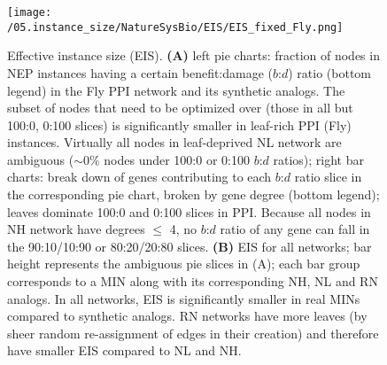 \begin{figure}[H]%
    \texttt{[image: /05.instance\_size/NatureSysBio/EIS/EIS\_fixed\_Fly.png]}
    \caption{
                Effective instance size (EIS). \textbf{(A)} left pie charts: fraction of nodes in NEP instances having a certain benefit:damage ($b$:$d$) ratio (bottom legend) in the Fly PPI network and its synthetic analogs. The subset of nodes that need to be optimized over (those in all but 100:0, 0:100 slices) is significantly smaller in leaf-rich PPI (Fly) instances. Virtually all nodes in leaf-deprived NL network are ambiguous (${\sim}0\%$ nodes under 100:0 or 0:100 $b$:$d$ ratios); right bar charts: break down of genes contributing to each $b$:$d$ ratio slice in the corresponding pie chart, broken by gene degree (bottom legend); leaves dominate 100:0 and 0:100 slices in PPI. Because all nodes in NH network have degrees  $\leq$ 4, no $b$:$d$ ratio of any gene can fall in the 90:10/10:90 or 80:20/20:80  slices. \textbf{(B)} EIS for all networks; bar height represents the ambiguous pie slices in (A); each bar group corresponds to a MIN along with its corresponding NH, NL and RN analogs. In all networks, EIS is significantly smaller in real MINs  compared to synthetic analogs. RN networks have more leaves (by sheer random re-assignment of edges in their creation) and therefore have  smaller EIS compared to NL and NH.%
             }\label{wheel}
\end{figure}


